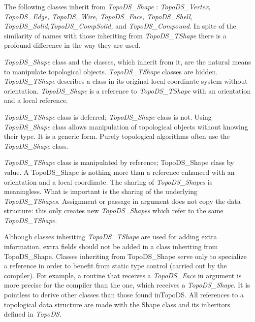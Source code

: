 The following classes inherit from {\itshape Topo\+D\+S\+\_\+\+Shape} \+: {\itshape Topo\+D\+S\+\_\+\+Vertex, Topo\+D\+S\+\_\+\+Edge, Topo\+D\+S\+\_\+\+Wire, Topo\+D\+S\+\_\+\+Face, Topo\+D\+S\+\_\+\+Shell, Topo\+D\+S\+\_\+\+Solid,Topo\+D\+S\+\_\+\+Comp\+Solid,} and {\itshape Topo\+D\+S\+\_\+\+Compound}. In spite of the similarity of names with those inheriting from {\itshape Topo\+D\+S\+\_\+\+T\+Shape} there is a profound difference in the way they are used.

{\itshape Topo\+D\+S\+\_\+\+Shape} class and the classes, which inherit from it, are the natural means to manipulate topological objects. {\itshape Topo\+D\+S\+\_\+\+T\+Shape} classes are hidden. {\itshape Topo\+D\+S\+\_\+\+T\+Shape} describes a class in its original local coordinate system without orientation. {\itshape Topo\+D\+S\+\_\+\+Shape} is a reference to {\itshape Topo\+D\+S\+\_\+\+T\+Shape} with an orientation and a local reference.

{\itshape Topo\+D\+S\+\_\+\+T\+Shape} class is deferred; {\itshape Topo\+D\+S\+\_\+\+Shape} class is not. Using {\itshape Topo\+D\+S\+\_\+\+Shape} class allows manipulation of topological objects without knowing their type. It is a generic form. Purely topological algorithms often use the {\itshape Topo\+D\+S\+\_\+\+Shape} class.

{\itshape Topo\+D\+S\+\_\+\+T\+Shape} class is manipulated by reference; Topo\+D\+S\+\_\+\+Shape class by value. A Topo\+D\+S\+\_\+\+Shape is nothing more than a reference enhanced with an orientation and a local coordinate. The sharing of {\itshape Topo\+D\+S\+\_\+\+Shapes} is meaningless. What is important is the sharing of the underlying {\itshape Topo\+D\+S\+\_\+\+T\+Shapes}. Assignment or passage in argument does not copy the data structure\+: this only creates new {\itshape Topo\+D\+S\+\_\+\+Shapes} which refer to the same {\itshape Topo\+D\+S\+\_\+\+T\+Shape}.

Although classes inheriting {\itshape Topo\+D\+S\+\_\+\+T\+Shape} are used for adding extra information, extra fields should not be added in a class inheriting from Topo\+D\+S\+\_\+\+Shape. Classes inheriting from Topo\+D\+S\+\_\+\+Shape serve only to specialize a reference in order to benefit from static type control (carried out by the compiler). For example, a routine that receives a {\itshape Topo\+D\+S\+\_\+\+Face} in argument is more precise for the compiler than the one, which receives a {\itshape Topo\+D\+S\+\_\+\+Shape}. It is pointless to derive other classes than those found in\+Topo\+DS. All references to a topological data structure are made with the Shape class and its inheritors defined in {\itshape Topo\+DS}.


